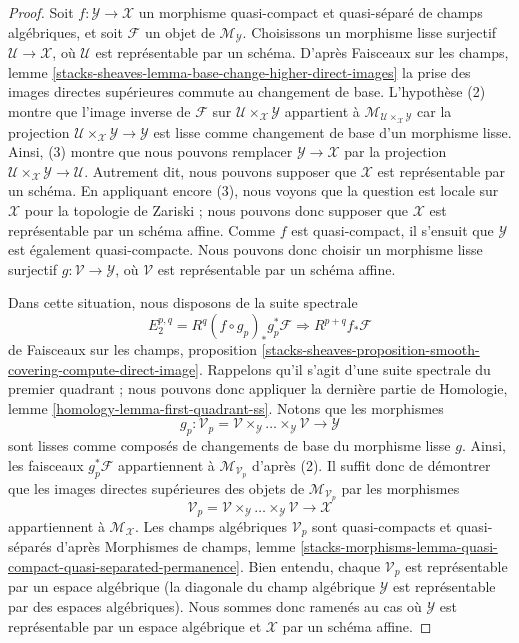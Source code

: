 \begin{proof}
Soit $f : \mathcal{Y} \to \mathcal{X}$ un morphisme quasi-compact et quasi-séparé
de champs algébriques, et soit $\mathcal{F}$ un objet de
$\mathcal{M}_\mathcal{Y}$. Choisissons un morphisme lisse surjectif
$\mathcal{U} \to \mathcal{X}$, où $\mathcal{U}$ est représentable par
un schéma. D'après
Faisceaux sur les champs, lemme
\ref{stacks-sheaves-lemma-base-change-higher-direct-images}
la prise des images directes supérieures commute au changement de base.
L'hypothèse (2) montre que l'image inverse de $\mathcal{F}$
sur $\mathcal{U} \times_\mathcal{X} \mathcal{Y}$ appartient à
$\mathcal{M}_{\mathcal{U} \times_\mathcal{X} \mathcal{Y}}$
car la projection
$\mathcal{U} \times_\mathcal{X} \mathcal{Y} \to \mathcal{Y}$
est lisse comme changement de base d'un morphisme lisse. Ainsi, (3) montre que nous pouvons
remplacer $\mathcal{Y} \to \mathcal{X}$ par la projection
$\mathcal{U} \times_\mathcal{X} \mathcal{Y} \to \mathcal{U}$.
Autrement dit, nous pouvons supposer que $\mathcal{X}$
est représentable par un schéma.
En appliquant encore (3), nous voyons que la question est locale sur
$\mathcal{X}$ pour la topologie de Zariski ; nous pouvons donc supposer que $\mathcal{X}$ est représentable par
un schéma affine. Comme $f$ est quasi-compact, il s'ensuit que
$\mathcal{Y}$ est également quasi-compacte. Nous pouvons donc choisir un morphisme lisse surjectif
$g : \mathcal{V} \to \mathcal{Y}$, où $\mathcal{V}$ est représentable
par un schéma affine.

\medskip\noindent
Dans cette situation, nous disposons de la suite spectrale
$$
E_2^{p, q} = R^q(f \circ g_p)_*g_p^*\mathcal{F}
\Rightarrow
R^{p + q}f_*\mathcal{F}
$$
de
Faisceaux sur les champs, proposition
\ref{stacks-sheaves-proposition-smooth-covering-compute-direct-image}.
Rappelons qu'il s'agit d'une suite spectrale du premier quadrant ; nous pouvons donc
appliquer la dernière partie de Homologie, lemme \ref{homology-lemma-first-quadrant-ss}.
Notons que les morphismes
$$
g_p : \mathcal{V}_p =
\mathcal{V} \times_\mathcal{Y} \ldots \times_\mathcal{Y} \mathcal{V}
\longrightarrow
\mathcal{Y}
$$
sont lisses comme composés de changements de base du morphisme lisse $g$.
Ainsi, les faisceaux $g_p^*\mathcal{F}$ appartiennent à
$\mathcal{M}_{\mathcal{V}_p}$ d'après (2). Il suffit donc de démontrer que les
images directes supérieures des objets de $\mathcal{M}_{\mathcal{V}_p}$ par
les morphismes
$$
\mathcal{V}_p =
\mathcal{V} \times_\mathcal{Y} \ldots \times_\mathcal{Y} \mathcal{V}
\longrightarrow
\mathcal{X}
$$
appartiennent à $\mathcal{M}_\mathcal{X}$. Les champs algébriques $\mathcal{V}_p$
sont quasi-compacts et quasi-séparés d'après
Morphismes de champs, lemme
\ref{stacks-morphisms-lemma-quasi-compact-quasi-separated-permanence}.
Bien entendu, chaque $\mathcal{V}_p$ est représentable par un espace algébrique
(la diagonale du champ algébrique $\mathcal{Y}$ est représentable
par des espaces algébriques). Nous sommes donc ramenés au cas où
$\mathcal{Y}$ est représentable par un espace algébrique et $\mathcal{X}$
par un schéma affine.


\end{proof}
